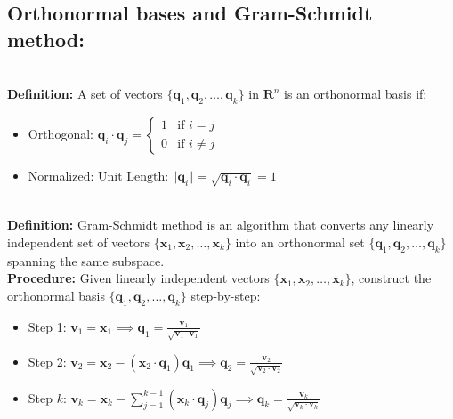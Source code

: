 \documentclass[DIV=20,oneside]{scrartcl}
\newcommand{\deff}{
	\noindent\textbf{\\Definition: }
}
\begin{document}
	\subsection{Orthonormal bases and Gram-Schmidt method:}
\deff 	A set of vectors $\{\mathbf{q}_1, \mathbf{q}_2, \dots, \mathbf{q}_k\}$ in $\mathbf{R}^n$ is an orthonormal basis if:
	\begin{itemize}
		\item 	Orthogonal: $\mathbf{q}_i \cdot \mathbf{q}_j = \begin{cases} 1 & \text{if } i = j \\ 0 & \text{if } i \neq j \quad \end{cases}$
		\item Normalized: $\text{Unit Length: } \Vert{}\mathbf{q}_i\Vert{} = \sqrt{\mathbf{q}_i \cdot \mathbf{q}_i} = 1$
	\end{itemize}
\deff Gram-Schmidt method is an algorithm that converts any linearly independent set of vectors $\{\mathbf{x}_1, \mathbf{x}_2, \dots, \mathbf{x}_k\}$ into an orthonormal set $\{\mathbf{q}_1, \mathbf{q}_2, \dots, \mathbf{q}_k\}$ spanning the same subspace.
\\
\textbf{Procedure: }Given linearly independent vectors $\{\mathbf{x}_1, \mathbf{x}_2, \dots, \mathbf{x}_k\}$, construct the orthonormal basis $\{\mathbf{q}_1, \mathbf{q}_2, \dots, \mathbf{q}_k\}$ step-by-step:
\begin{itemize}
	\item Step 1: $\mathbf{v}_1 = \mathbf{x}_1 \implies \mathbf{q}_1 = \frac{\mathbf{v}_1}{\sqrt{\mathbf{v}_1 \cdot \mathbf{v}_1}}$
	\item Step 2: $\mathbf{v}_2 = \mathbf{x}_2 - (\mathbf{x}_2 \cdot \mathbf{q}_1)\mathbf{q}_1 \implies \mathbf{q}_2 = \frac{\mathbf{v}_2}{\sqrt{\mathbf{v}_2 \cdot \mathbf{v}_2}}$
	\item Step $k$: $\mathbf{v}_k = \mathbf{x}_k - \sum_{j=1}^{k-1} (\mathbf{x}_k \cdot \mathbf{q}_j)\mathbf{q}_j \implies \mathbf{q}_k = \frac{\mathbf{v}_k}{\sqrt{\mathbf{v}_k \cdot \mathbf{v}_k}}$
\end{itemize}
\end{document}
